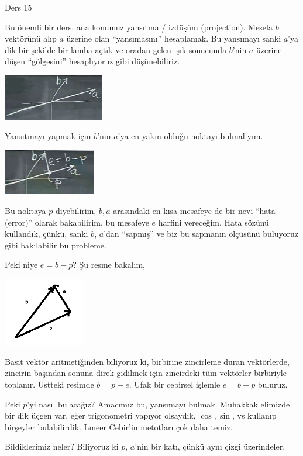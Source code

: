 \documentclass[12pt,fleqn]{article}\usepackage{../../common}
\begin{document}
Ders 15

Bu önemli bir ders, ana konumuz yansıtma / izdüşüm (projection). Mesela
$b$ vektörünü alıp $a$ üzerine olan ``yansımasını'' hesaplamak. Bu
yansımayı sanki $a$'ya dik bir şekilde bir lamba açtık ve oradan gelen
ışık sonucunda $b$'nin $a$ üzerine düşen ``gölgesini'' hesaplıyoruz gibi
düşünebiliriz. 

\includegraphics[height=2cm]{15_1.png}

Yansıtmayı yapmak için $b$'nin $a$'ya en yakın olduğu noktayı bulmalıyım. 

\includegraphics[height=2cm]{15_2.png}

Bu noktaya $p$ diyebilirim, $b,a$ arasındaki en kısa mesafeye de bir nevi
``hata (error)''  olarak bakabilirim, bu mesafeye $e$ harfini
vereceğim. Hata sözünü kullandık, çünkü, sanki $b$, $a$'dan ``sapmış'' ve
biz bu sapmanın ölçüsünü buluyoruz gibi bakılabilir bu probleme. 

Peki niye $e = b-p$? Şu resme bakalım, 

\includegraphics[height=3cm]{15_3.png}

Basit vektör aritmetiğinden biliyoruz ki, birbirine zincirleme duran
vektörlerde, zincirin başından sonuna direk gidilmek için zincirdeki tüm
vektörler birbiriyle toplanır. Üstteki resimde $b = p + e$. Ufak bir
cebirsel işlemle $e = b - p$ buluruz. 

Peki $p$'yi nasıl bulacağız? Amacımız bu, yansımayı bulmak. Muhakkak
elimizde bir dik üçgen var, eğer trigonometri yapıyor olsaydık, $\cos,
\sin$, vs kullanıp birşeyler bulabilirdik. Lıneer Cebir'in metotları çok
daha temiz.

Bildiklerimiz neler? Biliyoruz ki $p$, $a$'nin bir katı, çünkü aynı çizgi
üzerindeler. 
\end{document}
